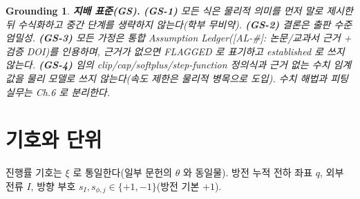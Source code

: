 \documentclass[11pt,a4paper]{article}
\newtheorem*{groundingbox}{Grounding}
\newcommand{\AL}[1]{\textsf{[AL-#1]}}
\begin{document}
\begin{groundingbox}
\textbf{지배 표준(GS).} \textbf{(GS-1)} 모든 식은 물리적 의미를 먼저 말로 제시한 뒤 수식화하고 중간
단계를 생략하지 않는다(학부 무비약). \textbf{(GS-2)} 결론은 출판 수준 엄밀성. \textbf{(GS-3)} 모든 가정은
통합 Assumption Ledger(\AL{\#}: 논문/교과서 근거 + 검증 DOI)를 인용하며, 근거가 없으면 FLAGGED 로
표기하고 established 로 쓰지 않는다. \textbf{(GS-4)} 임의 clip/cap/softplus/step-function 정의식과 근거
없는 수치 임계값을 물리 모델로 쓰지 않는다(속도 제한은 물리적 병목으로 도입). 수치 해법과 피팅 실무는
Ch.6 로 분리한다.
\end{groundingbox}

\tableofcontents
\newpage

\section{기호와 단위}\label{sec:notation}
진행률 기호는 $\xi$ 로 통일한다(일부 문헌의 $\theta$ 와 동일물). 방전 누적 전하 좌표 $q$, 외부 전류 $I$,
방향 부호 $s_I,s_{\phi,j}\in\{+1,-1\}$(방전 기본 $+1$).
\end{document}
